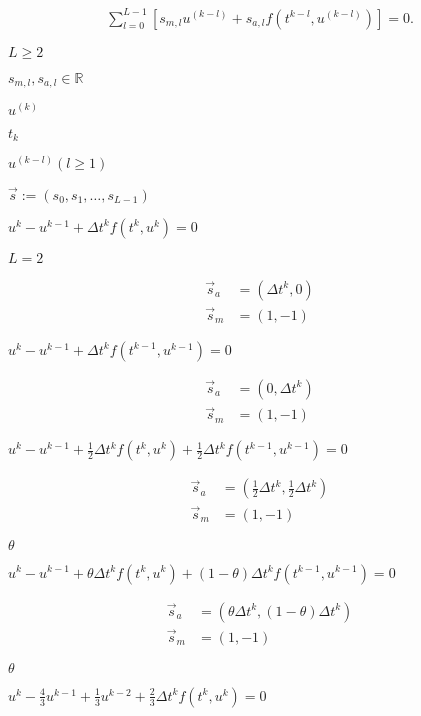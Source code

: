 \documentclass{article}
\begin{document}
\begin{align*} \sum_{l=0}^{L-1} \left[ s_{m,l} u^{(k-l)} + s_{a,l} f(t^{k-l}, u^{(k-l)}) \right] = 0. \end{align*}
\pagebreak

$L \geq 2$
\pagebreak

$s_{m,l}, s_{a,l} \in \mathbb{R}$
\pagebreak

$u^{(k)}$
\pagebreak

$t_k$
\pagebreak

$u^{(k-l)} (l \geq 1)$
\pagebreak

$\vec{s} := (s_0, s_1, \ldots, s_{L-1})$
\pagebreak

$ u^{k} - u^{k-1} + \Delta t^k f(t^k, u^k) = 0 $
\pagebreak

$L = 2$
\pagebreak

\begin{align*} \vec{s}_a &= (\Delta t^k, 0)\\ \vec{s}_m &= (1, -1) \end{align*}
\pagebreak

$ u^{k} - u^{k-1} + \Delta t^k f(t^{k-1}, u^{k-1}) = 0 $
\pagebreak

\begin{align*} \vec{s}_a &= (0, \Delta t^k)\\ \vec{s}_m &= (1, -1) \end{align*}
\pagebreak

$ u^{k} - u^{k-1} + \frac{1}{2} \Delta t^k f(t^{k}, u^{k}) + \frac{1}{2} \Delta t^k f(t^{k-1}, u^{k-1}) = 0$
\pagebreak

\begin{align*} \vec{s}_a &= (\frac{1}{2} \Delta t^k, \frac{1}{2} \Delta t^k)\\ \vec{s}_m &= (1, -1) \end{align*}
\pagebreak

$\theta$
\pagebreak

$ u^{k} - u^{k-1} + \theta \Delta t^k f(t^{k}, u^{k}) + (1- \theta) \Delta t^k f(t^{k-1}, u^{k-1}) = 0$
\pagebreak

\begin{align*} \vec{s}_a &= (\theta \Delta t^k, (1- \theta)\Delta t^k)\\ \vec{s}_m &= (1, -1) \end{align*}
\pagebreak

$ \theta$
\pagebreak

$ u^{k} - \frac{4}{3}u^{k-1} + \frac{1}{3}u^{k-2} + \frac{2}{3} \Delta t^k f(t^{k}, u^{k}) = 0$
\pagebreak
\end{document}
